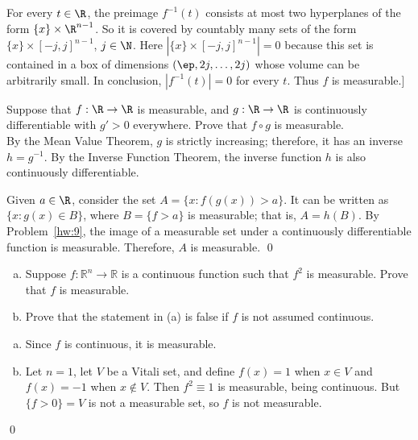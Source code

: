 For every $t \in \R$, the preimage $f^{-1}(t)$ consists at most two hyperplanes of the form $\{x\} \times  \R^{n-1}$. So it is covered by countably many sets of the form $\{x\} \times [-j, j]^{n-1}$, $j \in \N$. Here $|\{x\} \times [-j, j]^{n-1}|=0$ because this set is contained in a box of dimensions $(\ep, 2j,\ldots, 2j)$ whose volume can be arbitrarily small. In conclusion, $|f^{-1}(t)|=0$ for every $t$. Thus $f$ is measurable.] \\


\begin{hwsol}
Suppose that $f: \R \to \R$ is measurable, and $g: \R \to \R$ is continuously differentiable with $g'>0$ everywhere. Prove that $f \circ g$ is measurable. \\

\pf By the Mean Value Theorem, $g$ is strictly increasing; therefore, it has an inverse $h= g^{-1}$. By the Inverse Function Theorem, the inverse function $h$ is also continuously differentiable. 

Given $a \in \R$, consider the set $A= \{ x \colon f(g(x))> a \}$. It can be written as $\{x \colon g(x) \in B \}$, where $B= \{f>a\}$ is measurable; that is, $A= h(B)$. By Problem~\ref{hw:9}, the image of a measurable set under a continuously differentiable function is measurable. Therefore, $A$ is measurable. \qed \\
\end{hwsol}


\begin{hwsol} \hfill
\begin{enumerate}[(a)]
\item Suppose $f\colon \mathbb R^n\to\mathbb R$ is a continuous function such that $f^2$ is measurable. Prove that $f$ is measurable.
\item Prove that the statement in (a) is false if $f$ is not assumed continuous. \\
\end{enumerate}

\pf
\begin{enumerate}[(a)]
\item Since $f$ is continuous, it is measurable. 
\item Let $n=1$, let $V$ be a Vitali set, and define $f(x) = 1$ when $x \in V$ and $f(x)= -1$ when $x \notin V$. Then $f^2 \equiv 1$ is measurable, being continuous. But $\{f>0\}= V$ is not a measurable set, so $f$ is not measurable.
\end{enumerate} \qed \\
\end{hwsol}



